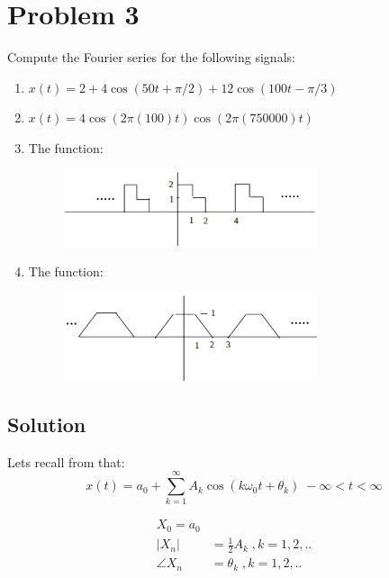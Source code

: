\section*{Problem 3}
Compute the Fourier series for the following signals:

\begin{enumerate}
\item $x(t) = 2 + 4 \cos(50t + \pi/2) + 12 \cos(100t-\pi/3)$

\item $x(t) = 4 \cos(2\pi(100)t)\cos(2\pi(750000)t)$

\item The function:
\begin{figure}[H]
\caption*{}
\centering
\includegraphics[width=0.7\textwidth]{figs/c1p3e1.png}
\label{fig:c1p3e1}
\end{figure} 

\item The function:
\begin{figure}[H]
\caption*{}
\centering
\includegraphics[width=0.7\textwidth]{figs/c1p3e2.png}
\label{fig:c1p3e2}
\end{figure} 

\end{enumerate} 

\subsection*{Solution}

Lets recall from \cite{kamen2000fundamentals} that:
\begin{equation*}
x(t) = a_0 + \displaystyle\sum_{k=1}^{\infty} A_k \cos(k \omega_0 t + \theta_k) \;
-\infty < t < \infty 
\end{equation*} 

\begin{equation}
\begin{aligned}
X_0 = a_0 \\
|X_n| &= \frac{1}{2} A_k \; , k=1,2,.. \\
\angle X_n &= \theta_k \; , k=1,2,..
\label{eq:c1p31}
\end{aligned}
\end{equation} 

